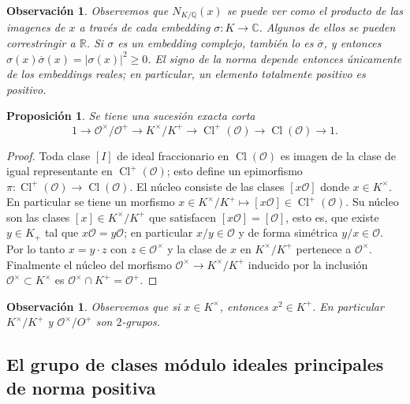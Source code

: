 \documentclass[11pt,a4paper]{amsart}
\newcommand{\C}{\mathbb{C}}
\newcommand{\R}{\mathbb{R}}
\newcommand{\Q}{\mathbb{Q}}
\DeclareMathOperator{\CL}{Cl}
\numberwithin{equation}{section}
\theoremstyle{plain}
\newtheorem{prop}[equation]{Proposición}
\newtheorem{obs}[equation]{Observación}
\renewcommand{\O}{\mathcal{O}}
\begin{document}
\begin{obs} Observemos que $N_{K/\Q}(x)$ se puede ver como el
producto de las imagenes de $x$ a través de cada
\textit{embedding} $\sigma \colon K \to \C$. Algunos de ellos
se pueden correstringir a $\R$. Si $\sigma$ es un embedding complejo,
también lo es $\overline \sigma$, y entonces
$\sigma(x)\overline\sigma(x) = |\sigma(x)|^2 \ge 0$. El signo
de la norma depende entonces únicamente de los embeddings reales; en
particular, un elemento totalmente positivo es positivo.
\end{obs}

\begin{prop} \label{prop:sec} Se tiene una sucesión exacta corta
\[
1 \to \O^\times/\O^+ \to K^\times/K^+ \to
\CL^+(\O) \to \CL(\O) \to 1.
\]
\end{prop}
\begin{proof} Toda clase $[I]$ de ideal fraccionario
en $\CL(\O)$ es imagen de la clase de igual representante en $\CL^+(\O)$;
esto define un epimorfismo $\pi \colon \CL^+(\O)\to\CL(\O)$. El núcleo consiste
de las clases $[x \O]$ donde $x \in K^\times$. En particular se tiene
un morfismo $x\in K^\times/K^+ \mapsto [x \O] \in \CL^+(\O)$.
Su núcleo son las clases $[x] \in K^\times/K^+$ que satisfacen
$[x\O] = [\O]$, esto es, que existe $y \in K_+$ tal que $x \O = y \O$;
en particular $x/y \in \O$ y de forma simétrica $y/x \in \O$.
Por lo tanto $x = y \cdot z$ con $z \in \O^\times$
y la clase de $x$ en $K^\times/K^+$ pertenece a $\O^\times$. Finalmente
el núcleo del morfismo $\O^\times \to K^\times/K^+$ inducido por la inclusión
$\O^\times \subset K^\times$ es $\O^\times \cap K^+ = \O^+$.
\end{proof}

\begin{obs} Observemos que si $x \in K^\times$, entonces $x^2 \in K^+$.
En particular $K^\times/K^+$ y $\O^\times/O^+$ son $2$-grupos.
\end{obs}

\subsection{El grupo de clases módulo ideales principales de norma positiva}
\end{document}
